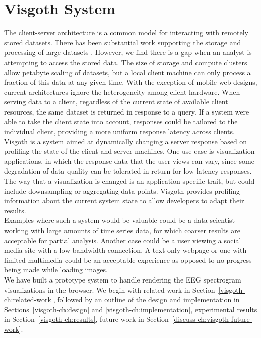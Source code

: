 \chapter{Visgoth System}\label{visgoth-ch}

The client-server architecture is a common model for interacting with remotely
stored datasets. There has been substantial work supporting the storage and
processing of large datasets \cite{hdfs} \cite{hadoop} \cite{spark}. However,
we find there is a gap when an analyst is attempting to access the stored data.
The size of storage and compute clusters allow petabyte scaling of datasets,
but a local client machine can only process a fraction of this data at any
given time. With the exception of mobile web designs, current architectures
ignore the heterogeneity among client hardware. When serving data to a client,
regardless of the current state of available client resources, the same dataset
is returned in response to a query. If a system were able to take the client
state into account, responses could be tailored to the individual client,
providing a more uniform response latency across clients. \\

Visgoth is a system aimed at dynamically changing a server response based on
profiling the state of the client and server machines. One use case is
visualization applications, in which the response data that the user views can
vary, since some degradation of data quality can be tolerated in return for low
latency responses. The way that a visualization is changed is an
application-specific trait, but could include downsampling or aggregating data
points. Visgoth provides profiling information about the current system state
to allow developers to adapt their results. \\

Examples where such a system would be valuable could be a data scientist
working with large amounts of time series data, for which coarser results are
acceptable for partial analysis. Another case could be a user viewing a social
media site with a low bandwidth connection. A text-only webpage or one with
limited multimedia could be an acceptable experience as opposed to no progress
being made while loading images. \\

We have built a prototype system to handle rendering the EEG spectrogram
visualizations in the browser.  We begin with related work in
Section~\ref{visgoth-ch:related-work}, followed by an outline of the design and
implementation in Sections~\ref{visgoth-ch:design} and
\ref{visgoth-ch:implementation}, experimental results in
Section~\ref{visgoth-ch:results}, future work in
Section~\ref{discuss-ch:visgoth-future-work}.

